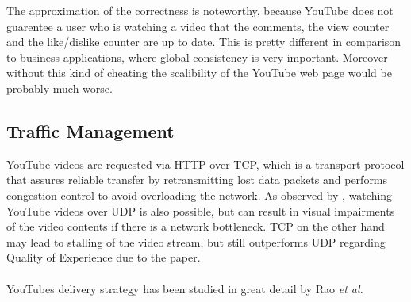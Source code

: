 The approximation of the correctness is noteworthy, because YouTube does not guarentee a user who is watching a video that the comments, the view counter and the like/dislike counter are up to date. This is pretty different in comparison to business applications, where global consistency is very important. Moreover without this kind of cheating the scalibility of the YouTube web page would be probably much worse.

\subsection{Traffic Management}

YouTube videos are requested via HTTP over TCP, which is a transport protocol that assures reliable transfer by retransmitting lost data packets and performs congestion control to avoid overloading the network. As observed by \cite{inc:transport_protocols}, watching YouTube videos over UDP is also possible, but can result in visual impairments of the video contents if there is a network bottleneck. TCP on the other hand may lead to stalling of the video stream, but still outperforms UDP regarding Quality of Experience due to the paper. \\
\\
YouTubes delivery strategy has been studied in great detail by Rao \emph{et al.} \cite{inp:network_characteristics}


